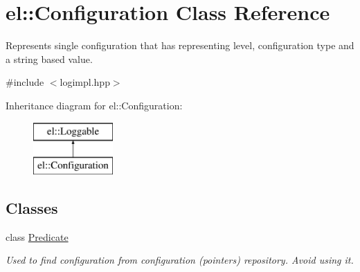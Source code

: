 \hypertarget{classel_1_1Configuration}{\section{el\-:\-:Configuration Class Reference}
\label{classel_1_1Configuration}
}


Represents single configuration that has representing level, configuration type and a string based value.  




{\ttfamily \#include $<$logimpl.\-hpp$>$}

Inheritance diagram for el\-:\-:Configuration\-:\begin{figure}[H]
\begin{center}
\leavevmode
\includegraphics[height=2.000000cm]{classel_1_1Configuration}
\end{center}
\end{figure}
\subsection*{Classes}
\begin{DoxyCompactItemize}
\item 
class \hyperlink{classel_1_1Configuration_1_1Predicate}{Predicate}
\begin{DoxyCompactList}\small\item\em Used to find configuration from configuration (pointers) repository. Avoid using it. \end{DoxyCompactList}\end{DoxyCompactItemize}
